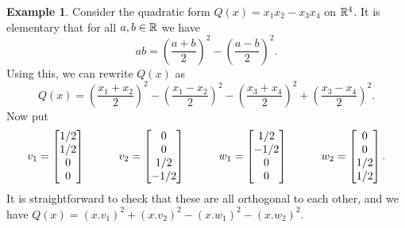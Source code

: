 \documentclass[reqno]{amsart}
\theoremstyle{definition}
\newtheorem{example}[theorem]{Example}
\begin{document}
\begin{example}\label{eg-quadratic-diag-i}
 Consider the quadratic form $Q(x)=x_1x_2-x_3x_4$ on ${\mathbb{R}}^4$.  It is
 elementary that for all $a,b\in{\mathbb{R}}$ we have 
 \[ ab = \left(\frac{a+b}{2}\right)^2 - 
         \left(\frac{a-b}{2}\right)^2.
 \]
 Using this, we can rewrite $Q(x)$ as
 \[ Q(x) =
     \left(\frac{x_1+x_2}{2}\right)^2
   - \left(\frac{x_1-x_2}{2}\right)^2
   - \left(\frac{x_3+x_4}{2}\right)^2
   + \left(\frac{x_3-x_4}{2}\right)^2.
 \]
 Now put 
 \[ 
    v_1 = \left[\begin{matrix} 1/2 \\ 1/2 \\ 0 \\ 0 \end{matrix}\right] \hspace{3em}
    v_2 = \left[\begin{matrix} 0 \\ 0 \\ 1/2 \\ -1/2 \end{matrix}\right] \hspace{3em}
    w_1 = \left[\begin{matrix} 1/2 \\ -1/2 \\ 0 \\ 0 \end{matrix}\right] \hspace{3em}
    w_2 = \left[\begin{matrix} 0 \\ 0 \\ 1/2 \\ 1/2 \end{matrix}\right].
 \]
 It is straightforward to check that these are all orthogonal to each
 other, and we have $Q(x)=(x.v_1)^2+(x.v_2)^2-(x.w_1)^2-(x.w_2)^2$.  
\end{example}
\end{document}
